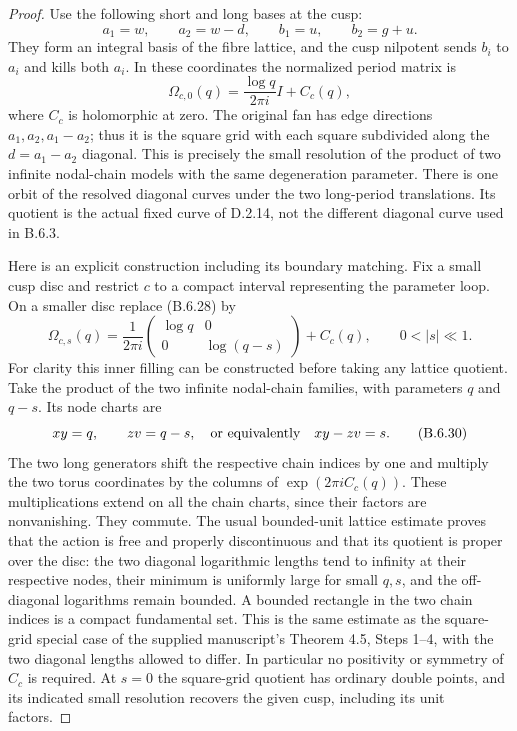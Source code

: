 \begin{proof}
Use the following short and long bases at the cusp:
\[
 a_1=w,\qquad a_2=w-d,\qquad
 b_1=u,\qquad b_2=g+u.
\]
They form an integral basis of the fibre lattice, and the cusp
nilpotent sends $b_i$ to $a_i$ and kills both $a_i$.  In these
coordinates the normalized period matrix is
\[
 \Omega_{c,0}(q)=\frac{\log q}{2\pi i}I+C_c(q),
 \tag{B.6.28}
\]
where $C_c$ is holomorphic at zero.  The original fan has edge
directions $a_1,a_2,a_1-a_2$; thus it is the square grid with
each square subdivided along the $d=a_1-a_2$ diagonal.
This is precisely the small resolution of the product of two
infinite nodal-chain models with the same degeneration parameter.
There is one orbit of the resolved diagonal curves under the two
long-period translations.  Its quotient is the actual fixed curve
of D.2.14, not the different diagonal curve used in B.6.3.

Here is an explicit construction including its boundary matching.
Fix a small cusp disc and restrict $c$ to a compact interval
representing the parameter loop.  On a smaller disc replace
(B.6.28) by
\[
 \Omega_{c,s}(q)=
  \frac1{2\pi i}
   \begin{pmatrix}\log q&0\\0&\log(q-s)\end{pmatrix}
      +C_c(q),\qquad 0<|s|\ll1.
 \tag{B.6.29}
\]
For clarity this inner filling can be constructed before taking
any lattice quotient.  Take the product of the two infinite
nodal-chain families, with parameters $q$ and $q-s$.  Its node
charts are
\[
 xy=q,\qquad zv=q-s,
 \quad\hbox{or equivalently}\quad xy-zv=s.
 \tag{B.6.30}
\]
The two long generators shift the respective chain indices by one
and multiply the two torus coordinates by the columns of
$\exp(2\pi iC_c(q))$.  These multiplications extend on all the
chain charts, since their factors are nonvanishing.  They commute.
The usual bounded-unit lattice estimate proves that the action is
free and properly discontinuous and that its quotient is proper
over the disc: the two diagonal logarithmic lengths tend to
infinity at their respective nodes, their minimum is uniformly
large for small $q,s$, and the off-diagonal logarithms remain
bounded.  A bounded rectangle in the two chain indices is a
compact fundamental set.  This is the same estimate as the
square-grid special case of the supplied manuscript's
Theorem 4.5, Steps 1--4, with the two diagonal lengths allowed
to differ.  In particular no positivity or symmetry of $C_c$
is required.  At $s=0$ the square-grid quotient has ordinary
double points, and its indicated small resolution recovers the
given cusp, including its unit factors.


\end{proof}
